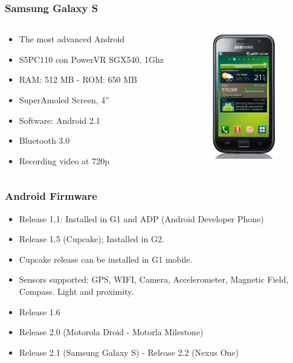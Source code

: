 \documentclass{beamer}
\begin{document}
\begin{frame}
\frametitle{Samsung Galaxy S}

\begin{columns}
\begin{column}{0.5\textwidth}

\begin{itemize}

\item The most advanced Android
\item S5PC110 con PowerVR SGX540, 1Ghz
\item RAM: 512 MB - ROM: 650 MB
\item SuperAmoled Screen, 4''
\item Software: Android 2.1
\item Bluetooth 3.0
\item Recording video at 720p
\end{itemize}
\end{column}

\begin{column}{0.5\textwidth}
\begin{center}
  \includegraphics[height=5.5cm]{figs/samsung-galaxy-s}
\end{center}
\end{column}
\end{columns}
\end{frame}


\begin {frame}
\frametitle{Android Firmware}

\begin{itemize}
\item Release 1.1: Installed in G1 and ADP (Android Developer Phone)
\item Release 1.5 (Cupcake); Installed in G2.
\item Cupcake release can be installed in G1 mobile.
\item Sensors supported: GPS, WIFI, Camera, Accelerometer, Magnetic Field,
Compass. Light and proximity.
\item Release 1.6
\item Release 2.0 (Motorola Droid - Motorla Milestone)
\item Release 2.1 (Samsung Galaxy S) - Release 2.2 (Nexus One)
\end{itemize}

\end{frame}
\end{document}
